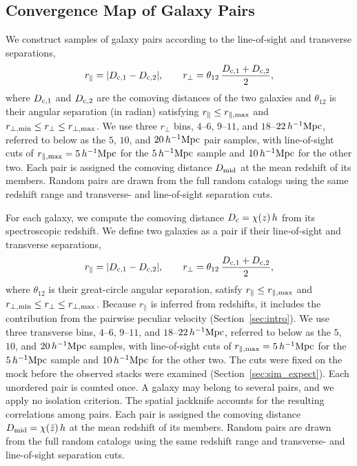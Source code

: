 \documentclass[preprint]{aastex701}
\newcommand{\hinvMpc}{h^{-1}{\rm Mpc}}
\begin{document}
\subsection{Convergence Map of Galaxy Pairs}
\label{sec:pairs}

We construct samples of galaxy pairs according to the line-of-sight and transverse separations,
\begin{equation}
  r_{\parallel} = |D_{{\rm c},1}-D_{{\rm c},2}|, \qquad
  r_{\perp} = \theta_{12}\,\frac{D_{{\rm c},1}+D_{{\rm c},2}}{2},
  \label{eq:separations}
\end{equation}
where $D_{\rm c,1}$ and $D_{\rm c,2}$ are the comoving distances of the two galaxies and $\theta_{12}$ is their angular separation (in radian) satisfying $r_{\parallel}\leq r_{\parallel,{\rm max}}$ and
$r_{\perp,{\rm min}}\leq r_{\perp}\leq r_{\perp,{\rm max}}$.
We use three  $r_\perp$ bins, $4$--$6$, $9$--$11$, and $18$--$22\,\hinvMpc$, referred to below as the $5$, $10$, and $20\,\hinvMpc$ pair samples, with line-of-sight cuts of $r_{\parallel,{\rm max}}=5\,\hinvMpc$ for the $5\,\hinvMpc$ sample and $10\,\hinvMpc$ for the other two. Each pair is assigned the comoving distance $D_{\rm mid}$ at the mean redshift of its members. Random pairs are drawn from the full random catalogs using the same redshift range and transverse- and line-of-sight separation cuts.

 {
For each galaxy, we compute the comoving distance $D_{\rm c}=\chi(z)\,h$ from
its spectroscopic redshift. We define two galaxies as a pair if their
line-of-sight and transverse separations,
\begin{equation}
  r_{\parallel} = |D_{{\rm c},1}-D_{{\rm c},2}|, \qquad
  r_{\perp} = \theta_{12}\,\frac{D_{{\rm c},1}+D_{{\rm c},2}}{2},
  \label{eq:separations}
\end{equation}
where $\theta_{12}$ is their great-circle angular separation, satisfy
$r_{\parallel}\leq r_{\parallel,{\rm max}}$ and
$r_{\perp,{\rm min}}\leq r_{\perp}\leq r_{\perp,{\rm max}}$. Because
$r_{\parallel}$ is inferred from redshifts, it includes the contribution from
the pairwise peculiar velocity (Section~\ref{sec:intro}). We
use three transverse bins, $4$--$6$, $9$--$11$, and $18$--$22\,\hinvMpc$,
referred to below as the $5$, $10$, and $20\,\hinvMpc$ samples, with
line-of-sight cuts of $r_{\parallel,{\rm max}}=5\,\hinvMpc$ for the
$5\,\hinvMpc$ sample and $10\,\hinvMpc$ for the other two. The cuts were
fixed on the mock before the observed stacks were examined
(Section~\ref{sec:sim_expect}). Each unordered pair is counted once. A
galaxy may belong to several pairs, and we apply no isolation criterion. The
spatial jackknife accounts for the resulting correlations among pairs. Each
pair is assigned the comoving distance
$D_{\rm mid}=\chi(\bar z)\,h$ at the mean redshift of its members. Random
pairs are drawn from the full random catalogs using the same redshift range
and transverse- and line-of-sight separation cuts.
}\fi
\end{document}
